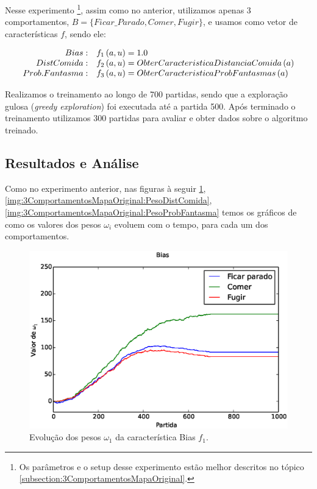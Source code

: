 Nesse experimento%
\footnote{Os parâmetros e o setup desse experimento estão melhor descritos no tópico \ref{subsection:3ComportamentosMapaOriginal}.%
}, assim como no anterior, utilizamos apenas 3 comportamentos, $ B = \{Ficar\_Parado, Comer, Fugir\} $, e usamos como vetor de características $ f $, sendo ele:

\begin{equation}
	\begin{array}{r l}
		Bias: & f_1 \left( a, u \right) = 1.0 \\
		Dist Comida: & f_2 \left( a, u \right) = ObterCaracteristicaDistanciaComida \left( a \right) \\
		Prob. Fantasma: & f_3 \left( a, u \right) = ObterCaracteristicaProbFantasmas \left( a \right)
	\end{array}
\end{equation}

Realizamos o treinamento ao longo de 700 partidas, sendo que a exploração gulosa (\textit{greedy exploration}) foi executada até a partida 500. Após terminado o treinamento utilizamos 300 partidas para avaliar e obter dados sobre o algoritmo treinado.


\subsection{Resultados e Análise}

Como no experimento anterior, nas figuras à seguir \ref{img:3ComportamentosMapaOriginal:PesoBias}, \ref{img:3ComportamentosMapaOriginal:PesoDistComida}, \ref{img:3ComportamentosMapaOriginal:PesoProbFantasma} temos os gráficos de como os valores dos pesos $ \omega_i $ evoluem com o tempo, para cada um dos comportamentos.

\begin{figure}[H]
    \centering
    \includegraphics[width=\linewidth]{images/3_behaviors_original_map/weights____pol__Bias}
    \caption{Evolução dos pesos $ \omega_1 $ da característica Bias $ f_1 $.}
    \label{img:3ComportamentosMapaOriginal:PesoBias}
\end{figure}

